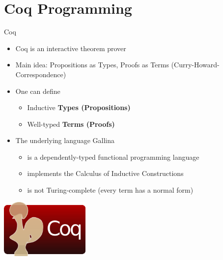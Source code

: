 
\section{Coq Programming}

\begin{frame}{Coq}
\begin{itemize}
  \item Coq is an interactive theorem prover
  \item Main idea: Propositions as Types, Proofs as Terms (Curry-Howard-Correspondence)
  \item One can define
    \begin{itemize}
      \item Inductive \textbf{Types (Propositions)}
      \item Well-typed \textbf{Terms (Proofs)}
    \end{itemize}
  \item The underlying language Gallina
    \begin{itemize}
      \item is a dependently-typed functional programming language
      \item implements the Calculus of Inductive Constructions
      \item is not Turing-complete (every term has a normal form)
    \end{itemize}
\end{itemize}
\begin{center}
  \includegraphics[width=0.33\textwidth]{content/theorem-proving/images/coq.png}
\end{center}
\end{frame}

